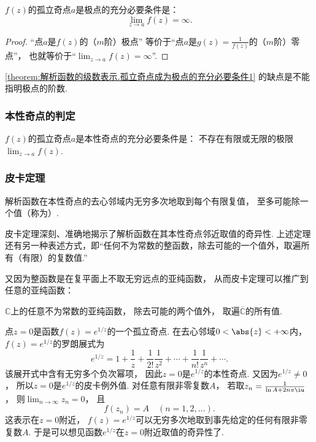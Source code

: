 \begin{corollary}\label{theorem:解析函数的级数表示.孤立奇点成为极点的充分必要条件1}
\(f(z)\)的孤立奇点\(a\)是极点的充分必要条件是：\begin{equation*}
	\lim_{z \to a} f(z) = \infty.
\end{equation*}
\begin{proof}
“点\(a\)是\(f(z)\)的（\(m\)阶）极点”
等价于“点\(a\)是\(g(z) = \frac{1}{f(z)}\)的（\(m\)阶）零点”，
也就等价于“\(\lim_{z \to a} f(z) = \infty\)”.
\end{proof}
\end{corollary}
\cref{theorem:解析函数的级数表示.孤立奇点成为极点的充分必要条件1} 的缺点是不能指明极点的阶数.

\subsubsection{本性奇点的判定}
\begin{theorem}
\(f(z)\)的孤立奇点\(a\)是本性奇点的充分必要条件是：
不存在有限或无限的极限\(\lim_{z \to a} f(z)\).
\end{theorem}

\subsubsection{皮卡定理}
\begin{theorem}[皮卡定理]
解析函数在本性奇点的去心邻域内无穷多次地取到每个有限复值，
至多可能除一个值（称为）.
\end{theorem}
皮卡定理深刻、准确地揭示了解析函数在其本性奇点邻近取值的奇异性.
上述定理还有另一种表述方式，即“任何不为常数的整函数，除去可能的一个值外，取遍所有（有限）的复数值.”

又因为整函数是在复平面上不取无穷远点的亚纯函数，
从而皮卡定理可以推广到任意的亚纯函数：
\begin{theorem}
\(\mathbb{C}\)上的任意不为常数的亚纯函数，
除去可能的两个值外，
取遍\(\overline{\mathbb{C}}\)的所有值.
\end{theorem}

\begin{example}
点\(z=0\)是函数\(f(z) = e^{1/z}\)的一个孤立奇点.
在去心邻域\(0<\abs{z}<+\infty\)内，
\(f(z) = e^{1/z}\)的罗朗展式为\begin{equation*}
	e^{1/z}
	= 1 + \frac{1}{z}
	+ \frac{1}{2!} \frac{1}{z^2}
	+ \dotsb
	+ \frac{1}{n!} \frac{1}{z^n}
	+ \dotsb.
\end{equation*}
该展开式中含有无穷多个负次幂项，
因此\(z=0\)是\(e^{1/z}\)的本性奇点.
又因为\(e^{1/z}\neq0\)，
所以\(z=0\)是\(e^{1/z}\)的皮卡例外值.
对任意有限非零复数\(A\)，
若取\(z_n = \frac{1}{\ln A + 2n\pi\iu}\)，
则\(\lim_{n\to\infty} z_n = 0\)，
且\begin{equation*}
	f(z_n) = A
	\quad(n=1,2,\dotsc).
\end{equation*}
这表示在\(z=0\)附近，
\(f(z) = e^{1/z}\)可以无穷多次地取到事先给定的任何有限非零复数\(A\).
于是可以想见函数\(e^{1/z}\)在\(z=0\)附近取值的奇异性了.
\end{example}

